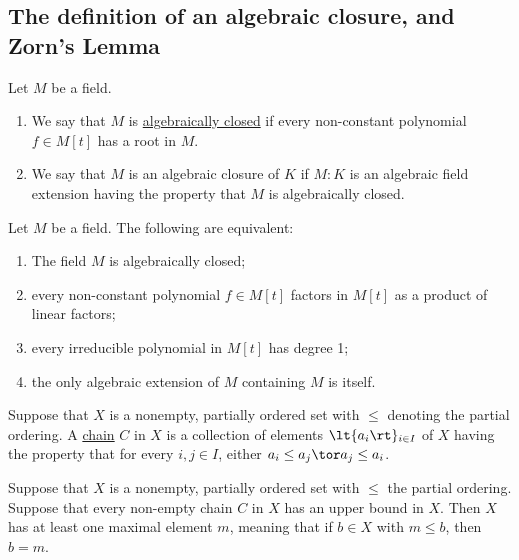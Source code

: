 \documentclass{article}
\begin{document}
\subsection{The definition of an algebraic closure, and Zorn's Lemma}
  \begin{tdefinition}
    Let \( M \) be a field.
    \begin{enumerate}[label=(\roman*)]
      \item We say that \( M \) is \ul{algebraically closed} if every non-constant polynomial \( f\in M[t] \) has a root in \( M \).
      \item We say that \( M \) is an algebraic closure of \( K \) if \( M:K \) is an algebraic field extension having the property that \( M \) is algebraically closed.
    \end{enumerate}
  \end{tdefinition}

  \begin{tlemma}
    Let \( M \) be a field.
    The following are equivalent: \begin{enumerate}[label=(\roman*)]
      \item The field \( M \) is algebraically closed;
      \item every non-constant polynomial \( f\in M[t] \) factors in \( M[t] \) as a product of linear factors;
      \item every irreducible polynomial in \( M[t] \) has degree 1;
      \item the only algebraic extension of \( M \) containing \( M \) is itself.
    \end{enumerate}
  \end{tlemma}

  \begin{tdefinition}[Chain]
    Suppose that \( X \) is a nonempty, partially ordered set with \( \leq \) denoting the partial ordering.
    A \ul{chain} \( C \) in \( X \) is a collection of elements \( \lt\{ a_i \rt\}_{i\in I} \) of \( X \) having the property that for every \( i,j\in I \), either \( a_i\leq a_j \tor a_j\leq a_i \).
  \end{tdefinition}

  \quad Suppose that \( X \) is a nonempty, partially ordered set with \( \leq \) the partial ordering.
  Suppose that every non-empty chain \( C \) in \( X \) has an upper bound in \( X \).
  Then \( X \) has at least one maximal element \( m \), meaning that if \( b\in X \) with \( m\leq b \), then \( b=m \).
\end{document}
